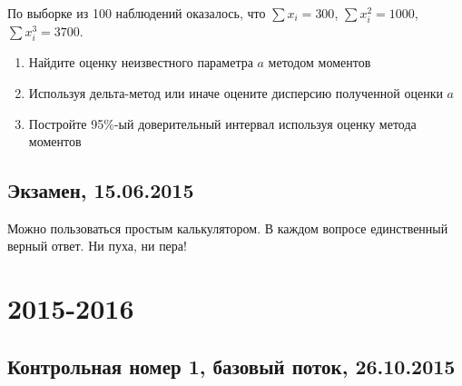 \documentclass[12pt, a4paper]{article}\usepackage[]{graphicx}\usepackage[]{color}
\begin{document}
По выборке из 100 наблюдений оказалось, что $\sum x_i =300$, $\sum x_i^2=1000$, $\sum x_i^3=3700$.

\begin{enumerate}
\item Найдите оценку неизвестного параметра $a$ методом моментов
\item Используя дельта-метод или иначе оцените дисперсию полученной оценки $a$
\item Постройте 95\%-ый доверительный интервал используя оценку метода моментов
\end{enumerate}


\subsection{Экзамен, 15.06.2015}



\vspace{3ex}

Можно пользоваться простым калькулятором.  В каждом вопросе единственный верный ответ. Ни пуха, ни пера!

\vspace{3ex}



\section{2015-2016}




\subsection{Контрольная номер 1, базовый поток, 26.10.2015}
\end{document}
